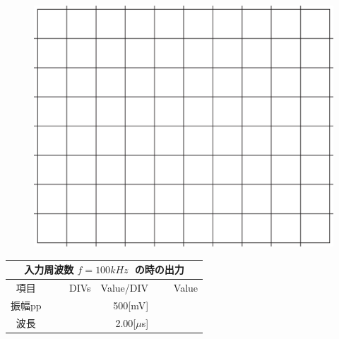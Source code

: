 \documentclass[uplatex,a4paper,11pt,oneside,openany]{jsbook}
\begin{document}
\begin{multicols}{2}
  \begin{figure}[H]
     \centering
      \includegraphics[keepaspectratio, scale=0.28, angle=0]
                  {figs/eps/grid.eps}
                  \label{fig:grid50mV}
  \end{figure}

  \begin{spacing}{1.5}
  \begin{tabular}{|c||r|r|r|}
    \multicolumn{4}{c}{入力周波数 $f=100kHz\;$ の時の出力} \\ \hline
    項目 & DIVs & Value/DIV & Value \\ \hline \hline
    振幅pp & 　　　　 & 500[mV]& 　　　　 \\ \hline
    波長 & 　　　　 & 2.00[$\mu$s]& 　　　　 \\ \hline
  \end{tabular}
\end{spacing}
\end{multicols}

\vfill

\newpage
\end{document}
